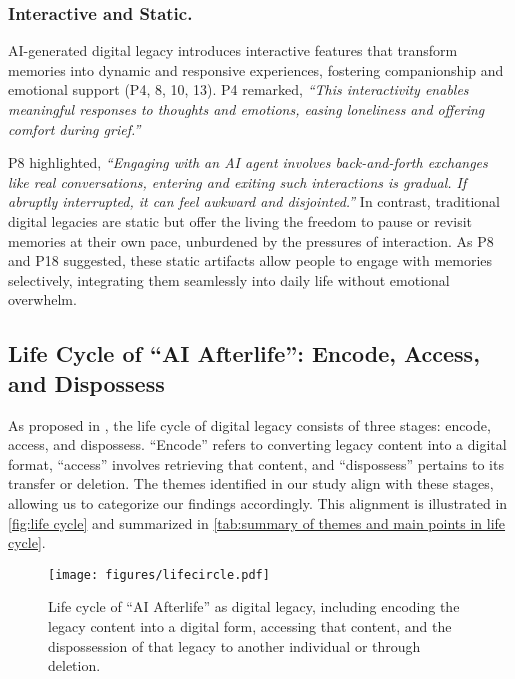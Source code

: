 \subsubsection{Interactive and Static.} \label{Interactive and Static}

AI-generated digital legacy introduces interactive features that transform memories into dynamic and responsive experiences, fostering companionship and emotional support (P4, 8, 10, 13). 
P4 remarked, \textit{``This interactivity enables meaningful responses to thoughts and emotions, easing loneliness and offering comfort during grief.''} 

P8 highlighted, \textit{``Engaging with an AI agent involves back-and-forth exchanges like real conversations, entering and exiting such interactions is gradual. If abruptly interrupted, it can feel awkward and disjointed.''} 
In contrast, traditional digital legacies are static but offer the living the freedom to pause or revisit memories at their own pace, unburdened by the pressures of interaction. As P8 and P18 suggested, these static artifacts allow people to engage with memories selectively, integrating them seamlessly into daily life without emotional overwhelm.

\subsection{Life Cycle of ``AI Afterlife'': Encode, Access, and Dispossess} \label{life cycle section}
As proposed in \cite{doyle2023digital}, the life cycle of digital legacy consists of three stages: encode, access, and dispossess. ``Encode'' refers to converting legacy content into a digital format, ``access'' involves retrieving that content, and ``dispossess'' pertains to its transfer or deletion. The themes identified in our study align with these stages, allowing us to categorize our findings accordingly. This alignment is illustrated in \autoref{fig:life cycle} and summarized in \autoref{tab:summary of themes and main points in life cycle}.

\begin{figure*}[htbp]
	\centering 
	\texttt{[image: figures/lifecircle.pdf]}
	\caption{Life cycle of ``AI Afterlife'' as digital legacy, including encoding the legacy content into a digital form, accessing that content, and the dispossession of that legacy to another individual or through deletion.}
	\label{fig:life cycle}
        \Description{}
\end{figure*}

